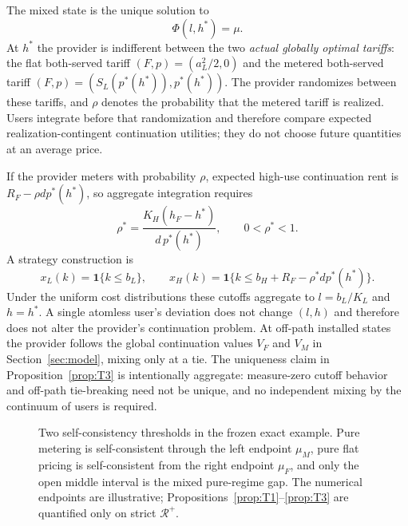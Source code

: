 The mixed state is the unique solution to
\begin{equation}
 \Phi(l,h^*)=\mu.
 \label{eq:hstar}
\end{equation}
At $h^*$ the provider is indifferent between the two \emph{actual globally optimal tariffs}: the flat both-served tariff $(F,p)=(a_L^2/2,0)$ and the metered both-served tariff $(F,p)=(S_L(p^*(h^*)),p^*(h^*))$. The provider randomizes between these tariffs, and $\rho$ denotes the probability that the metered tariff is realized. Users integrate before that randomization and therefore compare expected realization-contingent continuation utilities; they do not choose future quantities at an average price.

If the provider meters with probability $\rho$, expected high-use continuation rent is $R_F-\rho d p^*(h^*)$, so aggregate integration requires
\begin{equation}
 \rho^*=\frac{K_H(h_F-h^*)}{d\,p^*(h^*)},
 \qquad 0<\rho^*<1.
 \label{eq:rhostar}
\end{equation}
A strategy construction is
\begin{equation}
 x_L(k)=\mathbf 1\{k\leq b_L\},
 \qquad
 x_H(k)=\mathbf 1\{k\leq b_H+R_F-\rho^*d p^*(h^*)\}.
 \label{eq:integration-strategies}
\end{equation}
Under the uniform cost distributions these cutoffs aggregate to $l=b_L/K_L$ and $h=h^*$. A single atomless user's deviation does not change $(l,h)$ and therefore does not alter the provider's continuation problem. At off-path installed states the provider follows the global continuation values $V_F$ and $V_M$ in Section~\ref{sec:model}, mixing only at a tie. The uniqueness claim in Proposition~\ref{prop:T3} is intentionally aggregate: measure-zero cutoff behavior and off-path tie-breaking need not be unique, and no independent mixing by the continuum of users is required.

\begin{figure}[ht]
  \centering
  
  \caption{Two self-consistency thresholds in the frozen exact example. Pure metering is self-consistent through the left endpoint $\mu_M$, pure flat pricing is self-consistent from the right endpoint $\mu_F$, and only the open middle interval is the mixed pure-regime gap. The numerical endpoints are illustrative; Propositions~\ref{prop:T1}--\ref{prop:T3} are quantified only on strict $\mathcal R^+$.}
  \label{fig:threshold-phase}
\end{figure}

